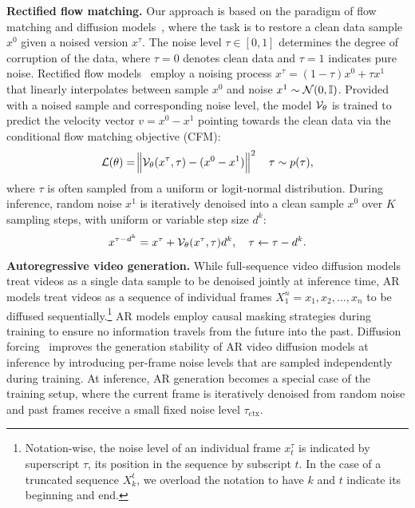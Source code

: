 \documentclass{article}
\theoremstyle{plain}
\theoremstyle{definition}
\theoremstyle{remark}
\begin{document}
\textbf{Rectified flow matching.} Our approach is based on the paradigm of flow matching and diffusion models~\citep{lipman2022flow}, where the task is to restore a clean data sample $x^0$ given a noised version $x^\tau$.
The noise level $\tau \in [0, 1]$ determines the degree of corruption of the data, where $\tau=0$ denotes clean data and $\tau=1$ indicates pure noise.
Rectified flow models~\citep{lipman2022flow,albergo2023building} employ a noising process $x^\tau = (1-\tau)x^0 + \tau x^1$ that linearly interpolates between sample $x^0$ and noise $x^1 \sim \mathcal{N}(0,{\mathbb{I}})$. 
Provided with a noised sample and corresponding noise level, the model ${\mathcal{V}}_\theta$ is trained to predict the velocity vector $v = x^0 - x^1$ pointing towards the clean data via the conditional flow matching objective (CFM): 
\begin{equation}
    \mathcal{L}(\theta) = \norm{{\mathcal{V}}_\theta (x^\tau, \tau) - (x^0 - x^1)}^2 \quad \tau \sim p(\tau),
\end{equation}
where $\tau$ is often sampled from a uniform or logit-normal distribution.
During inference, random noise $x^1$ is iteratively denoised into a clean sample $x^0$ over $K$ sampling steps, with uniform or variable step size $d^k$:
\begin{equation}
    x^{\tau - d^k} = x^\tau + {\mathcal{V}}_\theta (x^\tau, \tau) d^k, \quad \tau \leftarrow \tau - d^k.
\end{equation}
\textbf{Autoregressive video generation.} While full-sequence video diffusion models treat videos as a single data sample to be denoised jointly at inference time, AR models treat videos as a sequence of individual frames $X^{n}_1 = x_1,x_2,\dots,x_n$ to be diffused sequentially.\footnote{Notation-wise, the noise level of an individual frame $x^\tau_t$ is indicated by superscript $\tau$, its position in the sequence by subscript $t$.
In the case of a truncated sequence $X_k^{t}$, we overload the notation to have $k$ and $t$ indicate its beginning and end.} AR models employ causal masking strategies during training to ensure no information travels from the future into the past. Diffusion forcing~\citep{chen2024diffusion}
improves the generation stability of AR video diffusion models at inference by introducing per-frame noise levels that are sampled independently during training.
At inference, AR generation becomes a special case of the training setup, where the current frame is iteratively denoised from random noise and past frames receive a small fixed noise level $\tau_\text{ctx}$.
\end{document}
